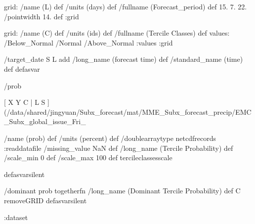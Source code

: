 \begin{ingrid}
grid:
/name (L) def
/units (days) def
/fullname (Forecast_period) def
15. 7. 22.
/pointwidth 14. def
:grid

grid:
/name (C) def
/units (ids) def
/fullname (Tercile Classes) def
values: /Below_Normal /Normal /Above_Normal :values
:grid

/target_date { S L add /long_name (forecast time) def /standard_name (time) def } defasvar

/prob {
[ X Y C | L S ] (/data/shared/jingyuan/Subx_forecast/mat/MME_Subx_forecast_precip/EMC_Subx_global_issue_Fri_%

/name (prob) def
/units (percent) def
/doublearraytype netcdfrecords :readdatafile
/missing_value NaN def
/long_name (Tercile Probability) def
/scale_min 0 def
/scale_max 100 def
tercileclassesscale
} defasvarsilent

/dominant {
prob togetherfn
/long_name (Dominant Tercile Probability) def
C removeGRID
} defasvarsilent

:dataset
\end{ingrid}
